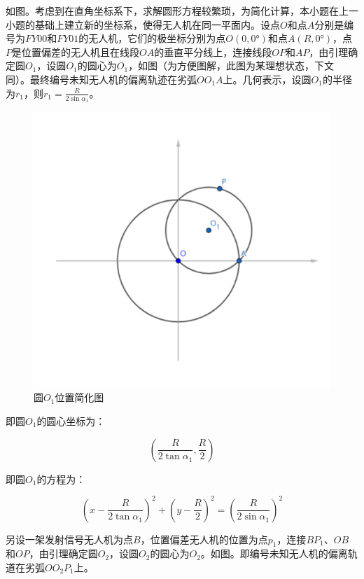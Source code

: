 如图。考虑到在直角坐标系下，求解圆形方程较繁琐，为简化计算，本小题在上一小题的基础上建立新的坐标系，使得无人机在同一平面内。设点$O$和点$A$分别是编号为$FY00$和$FY01$的无人机，它们的极坐标分别为点$O(0,0°)$和点$A(R,0°)$，点$P$是位置偏差的无人机且在线段$OA$的垂直平分线上，连接线段$OP$和$AP$，由引理确定圆$O_1$，设圆$O_1$的圆心为$O_1$，如图（为方便图解，此图为某理想状态，下文同）。最终编号未知无人机的偏离轨迹在劣弧$OO_1A$上。几何表示，设圆$O_1$的半径为$r_1$，则$r_1=\frac{R}{2\sin\alpha_1}$。

\begin{figure}[h]
    \centering
    \includegraphics{res/figure102034.png}
    \caption{圆$O_1$位置简化图}
\end{figure}

即圆$O_1$的圆心坐标为：

\begin{equation*}
    \left(
        \frac{R}{2\tan\alpha_1},\frac{R}{2}
    \right)
\end{equation*}

即圆$O_1$的方程为：

\begin{equation}
    \left(
        x - \frac{R}{2\tan\alpha_1}
    \right)^2
    +
    \left(
        y - \frac{R}{2}
    \right)^2
    =
    \left(
        \frac{R}{2\sin\alpha_1}
    \right)^2
\end{equation}

另设一架发射信号无人机为点$B$，位置偏差无人机的位置为点$p_1$，连接$BP_1$、$OB$和$OP$，由引理确定圆$O_2$，设圆$O_2$的圆心为$O_2$。如图。即编号未知无人机的偏离轨道在劣弧$OO_2P_1$上。


